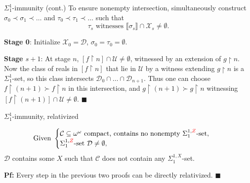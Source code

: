 \begin{frame}{$\Sigma_1^{1}$-immunity (cont.)}
  To ensure nonempty intersection, simultaneously construct
  $\sigma_0\prec\sigma_1\prec\ldots$ and
  $\tau_0\prec\tau_1\prec\ldots$ such that
  \[\tau_s \text{ witnesses } \llbracket\sigma_s\rrbracket
  \cap\mathcal{X}_s\neq\emptyset.\]

  \vspace{1em}
  \textbf{Stage 0}: Initialize $\mathcal{X}_0=\mathcal{D}$,
  $\sigma_0=\tau_0=\emptyset$.

  \vspace{1em}
  \textbf{Stage $s+1$}:
  At stage $n$, $[f\restriction n]\cap\mathcal{U} \neq\emptyset$, witnessed
  by an extension of $g\restriction n$. Now the class of reals in
  $[f\restriction n]$ that lie in $\mathcal{U}$ by a witness extending
  $g\restriction n$ is a $\Sigma^1_1$-set, so this class intersects
  $\mathcal{D}_0\cap\ldots\cap\mathcal{D}_{n+1}$. Thus one can choose
  $f\restriction (n+1) \succ f\restriction n$ in this intersection, and
  $g\restriction (n+1) \succ g\restriction n$ witnessing $[f\restriction
  (n+1)]\cap\mathcal{U} \neq\emptyset$. $\blacksquare$
\end{frame}

\begin{frame}{$\Sigma_1^{1}$-immunity, relativized}
  \begin{coro*}
    \begin{align*}
      \text{Given } &\begin{cases}
        \mathcal{C}\subseteq\omega^\omega \text{ compact, contains
        no nonempty } \Sigma^{1,\textcolor{red}{Z}}_{1}\text{-set},\\
        \Sigma^{1,\textcolor{red}{Z}}_{1}\text{-set }
        \mathcal{D}\neq\emptyset,
      \end{cases}
    \end{align*}
    $\mathcal{D}$ contains some $X$ such that $\mathcal{C}$ does not
    contain any $\Sigma_1^{1,X}$-set.
  \end{coro*}

  \vspace{2em}
  \textbf{Pf:} Every step in the previous two proofs can be directly
  relativized.
  $\blacksquare$
\end{frame}
